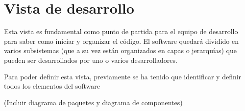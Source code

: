 \chapter{Vista de desarrollo}
Esta vista es fundamental como punto de partida para el equipo de desarrollo para saber como iniciar y organizar el c\'odigo. El software quedar\'a dividido en varios subsistemas (que a su vez est\'an organizados en capas o jerarqu\'ias) que pueden ser desarrollados por uno o varios desarrolladores.

Para poder definir esta vista, previamente se ha tenido que identificar y definir todos los elementos del software

(Incluir diagrama de paquetes y diagrama de componentes)

